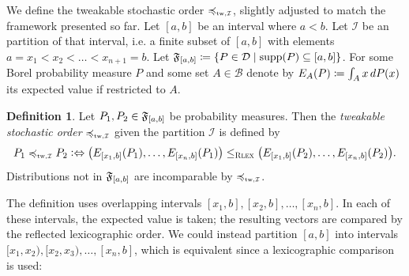 \documentclass[a4paper]{scrreprt}
\newcommand{\B}{\mathcal{B}}
\theoremstyle{definition}
\newtheorem{defn}[thm]{Definition} %
\begin{document}
    We define the tweakable stochastic order $\leqtw$, slightly adjusted to match the framework presented so far.
    Let $[a, b]$ be an interval where $a < b$. Let $\mathcal{I}$ be an partition of that interval, i.e. a finite subset of $[a, b]$ with elements $a = x_1 < x_2 < \dots < x_{n+1} = b$.
    Let $\mathfrak{F}_{[a, b]} \coloneqq \{P \in \mathcal{D} \mid \operatorname{supp}(P) \subseteq [a, b]\}$.
    For some Borel probability measure $P$ and some set $A \in \B$ denote by $E_A(P) \coloneqq \int_{A} x \, dP(x)$ its expected value if restricted to $A$. 
    \begin{defn}
        \label{def:tweakableStochasticOrder}
        Let $P_1, P_2 \in \mathfrak{F}_{[a, b]}$ be probability measures.
        Then the \emph{tweakable stochastic order} $\leqtw$ given the partition $\mathcal{I}$ is defined by
        \begin{gather*}
            P_1 \leqtw P_2 \colonlra \bigpars{E_{[x_1, b]}(P_{1}), \dots, E_{[x_n, b]}(P_1)} \leqRlex \bigpars{E_{[x_1, b]}(P_2), \dots, E_{[x_n, b]}(P_2)}.
        \end{gather*}
        Distributions not in $\mathfrak{F}_{[a, b]}$ are incomparable by $\leqtw$.
    \end{defn}

    The definition uses overlapping intervals $[x_1, b], [x_2, b], \dots, [x_n, b]$. In each of these intervals, the expected value is taken; the resulting vectors are compared by the reflected lexicographic order. We could instead partition $[a, b]$  into intervals $[x_1, x_2), [x_2, x_3), \dots, [x_n, b]$, which is equivalent since a lexicographic comparison is used:
\end{document}
